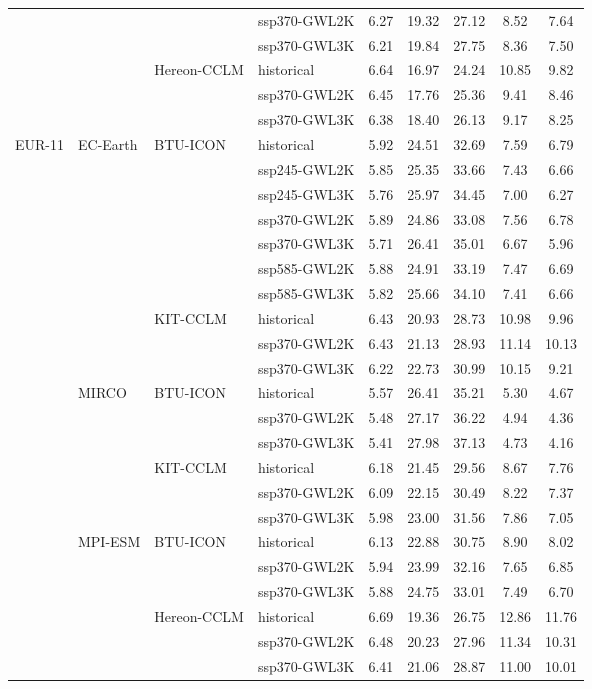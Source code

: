 \begin{table}[!htbp]
{\begin{tabular}{lll|l|c|c|c|c|c}
 &  &  & ssp370-GWL2K & 6.27 & 19.32 & 27.12 & 8.52 & 7.64 \\
 &  &  & ssp370-GWL3K & 6.21 & 19.84 & 27.75 & 8.36 & 7.50 \\
\cmidrule(lr){3-9}
 &  & \multirow{3}{*}{Hereon-CCLM} & historical & 6.64 & 16.97 & 24.24 & 10.85 & 9.82 \\
 &  &  & ssp370-GWL2K & 6.45 & 17.76 & 25.36 & 9.41 & 8.46 \\
 &  &  & ssp370-GWL3K & 6.38 & 18.40 & 26.13 & 9.17 & 8.25 \\
\midrule
\multirow{22}{*}{EUR-11} & \multirow{10}{*}{EC-Earth} & \multirow{7}{*}{BTU-ICON} & historical & 5.92 & 24.51 & 32.69 & 7.59 & 6.79 \\
 &  &  & ssp245-GWL2K & 5.85 & 25.35 & 33.66 & 7.43 & 6.66 \\
 &  &  & ssp245-GWL3K & 5.76 & 25.97 & 34.45 & 7.00 & 6.27 \\
 &  &  & ssp370-GWL2K & 5.89 & 24.86 & 33.08 & 7.56 & 6.78 \\
 &  &  & ssp370-GWL3K & 5.71 & 26.41 & 35.01 & 6.67 & 5.96 \\
 &  &  & ssp585-GWL2K & 5.88 & 24.91 & 33.19 & 7.47 & 6.69 \\
 &  &  & ssp585-GWL3K & 5.82 & 25.66 & 34.10 & 7.41 & 6.66 \\
\cmidrule(lr){3-9}
 &  & \multirow{3}{*}{KIT-CCLM} & historical & 6.43 & 20.93 & 28.73 & 10.98 & 9.96 \\
 &  &  & ssp370-GWL2K & 6.43 & 21.13 & 28.93 & 11.14 & 10.13 \\
 &  &  & ssp370-GWL3K & 6.22 & 22.73 & 30.99 & 10.15 & 9.21 \\
\cmidrule(lr){3-9}
\cmidrule(lr){2-9}
 & \multirow{6}{*}{MIRCO} & \multirow{3}{*}{BTU-ICON} & historical & 5.57 & 26.41 & 35.21 & 5.30 & 4.67 \\
 &  &  & ssp370-GWL2K & 5.48 & 27.17 & 36.22 & 4.94 & 4.36 \\
 &  &  & ssp370-GWL3K & 5.41 & 27.98 & 37.13 & 4.73 & 4.16 \\
\cmidrule(lr){3-9}
 &  & \multirow{3}{*}{KIT-CCLM} & historical & 6.18 & 21.45 & 29.56 & 8.67 & 7.76 \\
 &  &  & ssp370-GWL2K & 6.09 & 22.15 & 30.49 & 8.22 & 7.37 \\
 &  &  & ssp370-GWL3K & 5.98 & 23.00 & 31.56 & 7.86 & 7.05 \\
\cmidrule(lr){3-9}
\cmidrule(lr){2-9}
 & \multirow{6}{*}{MPI-ESM} & \multirow{3}{*}{BTU-ICON} & historical & 6.13 & 22.88 & 30.75 & 8.90 & 8.02 \\
 &  &  & ssp370-GWL2K & 5.94 & 23.99 & 32.16 & 7.65 & 6.85 \\
 &  &  & ssp370-GWL3K & 5.88 & 24.75 & 33.01 & 7.49 & 6.70 \\
\cmidrule(lr){3-9}
 &  & \multirow{3}{*}{Hereon-CCLM} & historical & 6.69 & 19.36 & 26.75 & 12.86 & 11.76 \\
 &  &  & ssp370-GWL2K & 6.48 & 20.23 & 27.96 & 11.34 & 10.31 \\
 &  &  & ssp370-GWL3K & 6.41 & 21.06 & 28.87 & 11.00 & 10.01 \\
\bottomrule
\end{tabular}
}
\end{table}
